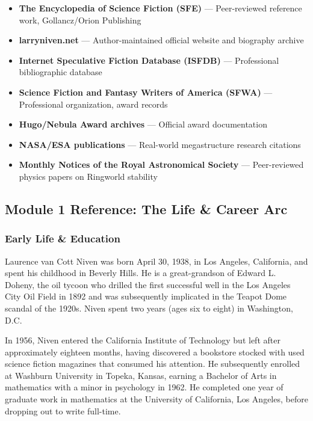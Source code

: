 \documentclass[11pt,letterpaper]{article}
\begin{document}
\begin{itemize}[leftmargin=2em]
\item \textbf{The Encyclopedia of Science Fiction (SFE)} --- Peer-reviewed reference work, Gollancz/Orion Publishing
\item \textbf{larryniven.net} --- Author-maintained official website and biography archive
\item \textbf{Internet Speculative Fiction Database (ISFDB)} --- Professional bibliographic database
\item \textbf{Science Fiction and Fantasy Writers of America (SFWA)} --- Professional organization, award records
\item \textbf{Hugo/Nebula Award archives} --- Official award documentation
\item \textbf{NASA/ESA publications} --- Real-world megastructure research citations
\item \textbf{Monthly Notices of the Royal Astronomical Society} --- Peer-reviewed physics papers on Ringworld stability
\end{itemize}

\subsection{Module 1 Reference: The Life \& Career Arc}

\subsubsection{Early Life \& Education}

Laurence van Cott Niven was born April 30, 1938, in Los Angeles, California, and spent his childhood in Beverly Hills. He is a great-grandson of Edward L. Doheny, the oil tycoon who drilled the first successful well in the Los Angeles City Oil Field in 1892 and was subsequently implicated in the Teapot Dome scandal of the 1920s. Niven spent two years (ages six to eight) in Washington, D.C.

In 1956, Niven entered the California Institute of Technology but left after approximately eighteen months, having discovered a bookstore stocked with used science fiction magazines that consumed his attention. He subsequently enrolled at Washburn University in Topeka, Kansas, earning a Bachelor of Arts in mathematics with a minor in psychology in 1962. He completed one year of graduate work in mathematics at the University of California, Los Angeles, before dropping out to write full-time.
\end{document}
